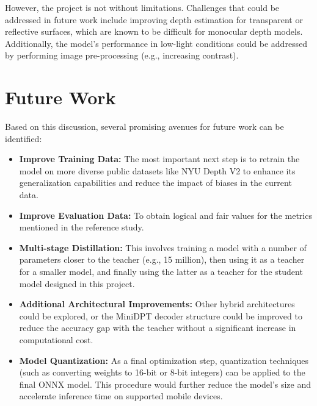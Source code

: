 However, the project is not without limitations. Challenges that could be addressed in future work include improving depth estimation for transparent or reflective surfaces, which are known to be difficult for monocular depth models. Additionally, the model's performance in low-light conditions could be addressed by performing image pre-processing (e.g., increasing contrast).

\section{Future Work}
\label{sec:future_work}

Based on this discussion, several promising avenues for future work can be identified:
\begin{itemize}
    \item \textbf{Improve Training Data:} The most important next step is to retrain the model on more diverse public datasets like NYU Depth V2 to enhance its generalization capabilities and reduce the impact of biases in the current data.
    \item \textbf{Improve Evaluation Data:} To obtain logical and fair values for the metrics mentioned in the reference study.
    \item \textbf{Multi-stage Distillation:} This involves training a model with a number of parameters closer to the teacher (e.g., 15 million), then using it as a teacher for a smaller model, and finally using the latter as a teacher for the student model designed in this project.
    \item \textbf{Additional Architectural Improvements:} Other hybrid architectures could be explored, or the MiniDPT decoder structure could be improved to reduce the accuracy gap with the teacher without a significant increase in computational cost.
    \item \textbf{Model Quantization:} As a final optimization step, quantization techniques (such as converting weights to 16-bit or 8-bit integers) can be applied to the final ONNX model. This procedure would further reduce the model's size and accelerate inference time on supported mobile devices.
\end{itemize}